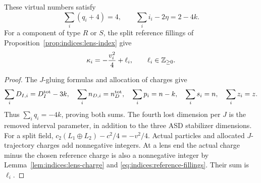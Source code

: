 \begin{lemma}\label{lem:indices:virtual-sums}
These virtual numbers satisfy
\begin{equation}\label{eq:indices:virtual-sums}
 \sum_i(q_i+4)=4,\qquad
 \sum_i i_i-2\eta=2-4k.
\end{equation}
For a component of type $R$ or $S$, the split reference fillings of
Proposition~\ref{prop:indices:lens-index} give
\begin{equation}\label{eq:indices:ell}
 \kappa_i=-\frac{v_i^2}{4}+\ell_i,\qquad \ell_i\in\mathbb Z_{\ge0}.
\end{equation}
\end{lemma}
\begin{proof}
The $J$-gluing formulas and allocation of charges give
\[
 \sum_iD_{I,i}=D_I^{\rm tot}-3k,\quad
 \sum_i n_{D,i}=n_D^{\rm tot},\quad
 \sum_i p_i=n-k,\quad \sum_i s_i=n,\quad \sum_i z_i=z.
\]
Thus $\sum_iq_i=-4k$, proving both sums.  The fourth lost dimension per
$J$ is the removed interval parameter, in addition to the three ASD
stabilizer dimensions.  For a split field,
$c_2(L_1\oplus L_2)-c^2/4=-v^2/4$.  Actual particles and allocated
$J$-trajectory charges add nonnegative integers.  At a lens end the actual
charge minus the chosen reference charge is also a nonnegative integer
by Lemma~\ref{lem:indices:lens-charge} and
\eqref{eq:indices:reference-fillings}.  Their sum is $\ell_i$.
\end{proof}

